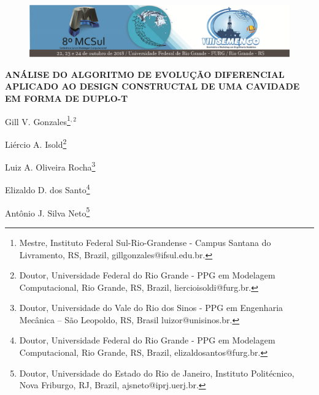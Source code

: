 \documentclass[12pt,A4,A4pt]{article}
\begin{document}

\begin{figure}
\centering
\vspace{-1cm}
\begin{minipage}[c]{\textwidth}
\centering
    \includegraphics[width=6.2in]{cabecalho.eps}
\end{minipage}
\end{figure}

\begin{center}
\fontsize{16pt}{\baselineskip}\selectfont 
\textbf{{ANÁLISE DO ALGORITMO DE EVOLUÇÃO DIFERENCIAL APLICADO AO DESIGN CONSTRUCTAL DE UMA CAVIDADE EM FORMA DE DUPLO-T}}
\end{center}
\vspace{-0.9cm}

\begin{flushright}
Gill V. Gonzales\footnote{Mestre, Instituto Federal Sul-Rio-Grandense - Campus Santana do Livramento, RS, Brazil, gillgonzales@ifsul.edu.br.}$^{,2}$

Liércio A. Isold\footnote{Doutor, Universidade Federal do Rio Grande - PPG em Modelagem Computacional, Rio Grande, RS, Brazil, liercioisoldi@furg.br.}

Luiz A. Oliveira Rocha\footnote{Doutor, Universidade do Vale do Rio dos Sinos - PPG em Engenharia Mecânica – São Leopoldo, RS, Brasil luizor@unisinos.br.}

Elizaldo D. dos Santo\footnote{Doutor, Universidade Federal do Rio Grande - PPG em Modelagem Computacional, Rio Grande, RS, Brazil, elizaldosantos@furg.br.}

Antônio J. Silva Neto\footnote{Doutor, Universidade do Estado do Rio de Janeiro, Instituto Politécnico, Nova Friburgo, RJ, Brazil, ajsneto@iprj.uerj.br.}

\end{flushright}
\end{document}

